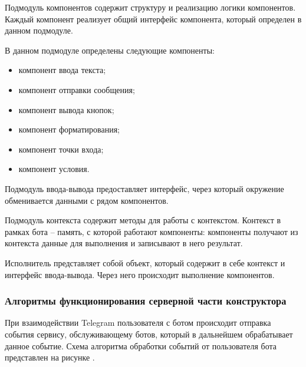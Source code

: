 Подмодуль компонентов содержит структуру и реализацию логики
компонентов. Каждый компонент реализует общий интерфейс компонента,
который определен в данном подмодуле.

В данном подмодуле определены следующие компоненты:
\begin{itemize}
	\item 	компонент ввода текста;
	\item 	компонент отправки сообщения;
	\item 	компонент вывода кнопок;
	\item 	компонент форматирования;
	\item 	компонент точки входа;
	\item 	компонент условия.
\end{itemize}

Подмодуль ввода-вывода предоставляет интерфейс, через который
окружение обменивается данными с рядом компонентов.

Подмодуль контекста содержит методы для работы с контекстом.
Контекст в рамках бота – память, с которой работают компоненты:
компоненты получают из контекста данные для выполнения и записывают в
него результат.

Исполнитель представляет собой объект, который содержит в себе
контекст и интерфейс ввода-вывода. Через него происходит выполнение
компонентов.


\subsubsection{Алгоритмы функционирования серверной части конструктора}

При взаимодействии Telegram пользователя с ботом происходит
отправка события сервису, обслуживающему ботов, который в дальнейшем
обрабатывает данное событие. Схема алгоритма обработки событий от
пользователя бота представлен на рисунке .
